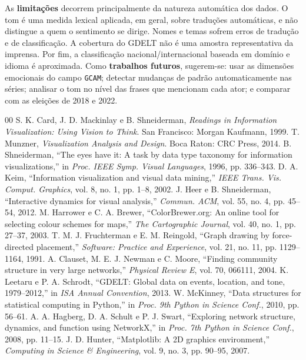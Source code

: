\documentclass[conference]{IEEEtran}
\begin{document}
As \textbf{limitações} decorrem principalmente da natureza automática dos dados. O tom é uma medida lexical aplicada, em geral, sobre traduções automáticas, e não distingue a quem o sentimento se dirige. Nomes e temas sofrem erros de tradução e de classificação. A cobertura do GDELT não é uma amostra representativa da imprensa. Por fim, a classificação nacional/internacional baseada em domínio e idioma é aproximada. Como \textbf{trabalhos futuros}, sugerem-se: usar as dimensões emocionais do campo \texttt{GCAM}; detectar mudanças de padrão automaticamente nas séries; analisar o tom no nível das frases que mencionam cada ator; e comparar com as eleições de 2018 e 2022.

\begin{thebibliography}{00}
 S. K. Card, J. D. Mackinlay e B. Shneiderman, \emph{Readings in Information Visualization: Using Vision to Think}. San Francisco: Morgan Kaufmann, 1999.
 T. Munzner, \emph{Visualization Analysis and Design}. Boca Raton: CRC Press, 2014.
 B. Shneiderman, ``The eyes have it: A task by data type taxonomy for information visualizations,'' in \emph{Proc. IEEE Symp. Visual Languages}, 1996, pp. 336--343.
 D. A. Keim, ``Information visualization and visual data mining,'' \emph{IEEE Trans. Vis. Comput. Graphics}, vol. 8, no. 1, pp. 1--8, 2002.
 J. Heer e B. Shneiderman, ``Interactive dynamics for visual analysis,'' \emph{Commun. ACM}, vol. 55, no. 4, pp. 45--54, 2012.
 M. Harrower e C. A. Brewer, ``ColorBrewer.org: An online tool for selecting colour schemes for maps,'' \emph{The Cartographic Journal}, vol. 40, no. 1, pp. 27--37, 2003.
 T. M. J. Fruchterman e E. M. Reingold, ``Graph drawing by force-directed placement,'' \emph{Software: Practice and Experience}, vol. 21, no. 11, pp. 1129--1164, 1991.
 A. Clauset, M. E. J. Newman e C. Moore, ``Finding community structure in very large networks,'' \emph{Physical Review E}, vol. 70, 066111, 2004.
 K. Leetaru e P. A. Schrodt, ``GDELT: Global data on events, location, and tone, 1979--2012,'' in \emph{ISA Annual Convention}, 2013.
 W. McKinney, ``Data structures for statistical computing in Python,'' in \emph{Proc. 9th Python in Science Conf.}, 2010, pp. 56--61.
 A. A. Hagberg, D. A. Schult e P. J. Swart, ``Exploring network structure, dynamics, and function using NetworkX,'' in \emph{Proc. 7th Python in Science Conf.}, 2008, pp. 11--15.
 J. D. Hunter, ``Matplotlib: A 2D graphics environment,'' \emph{Computing in Science \& Engineering}, vol. 9, no. 3, pp. 90--95, 2007.
\end{thebibliography}
\end{document}
